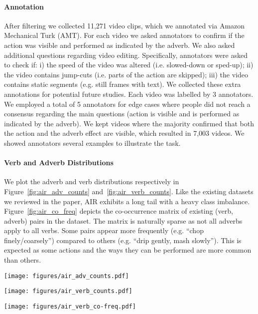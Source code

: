 \documentclass[10pt,twocolumn,letterpaper]{article}
\begin{document}
\paragraph{Annotation} After filtering we collected 11,271 video clips, which we annotated via Amazon Mechanical Turk (AMT). For each video we asked annotators to confirm if the action was visible and performed as indicated by the adverb. We also asked additional questions regarding video editing. Specifically, annotators were asked to check if: i) the speed of the video was altered (i.e. slowed-down or sped-up); ii) the video contains jump-cuts (i.e. parts of the action are skipped); iii) the video contains static segments (e.g. still frames with text). We collected these extra annotations for potential future studies. Each video was labelled by 3 annotators. We employed a total of 5 annotators for edge cases where people did not reach a consensus regarding the main questions (action is visible and is performed as indicated by the adverb). We kept videos where the majority confirmed that both the action and the adverb effect are visible, which resulted in 7,003 videos. We showed annotators several examples to illustrate the task. 

\vspace{-10pt}

\paragraph{Verb and Adverb Distributions} We plot the adverb and verb distributions respectively in Figure~\ref{fig:air_adv_counts} and~\ref{fig:air_verb_counts}. Like the existing datasets we reviewed in the paper, 
AIR exhibits a long tail with a heavy class imbalance. 
Figure~\ref{fig:air_co_freq} depicts the co-occurrence matrix of existing (verb, adverb) pairs in the dataset. The matrix is naturally sparse as not all adverbs apply to all verbs. Some 
pairs appear more frequently (e.g. ``chop finely/coarsely'') compared to others (e.g. ``drip gently, mash slowly''). This is expected as some actions and the ways they can be performed are more common than others.

\begin{figure*}[t]
    \centering
    \texttt{[image: figures/air\_adv\_counts.pdf]}
    \caption{Adverbs in Recipes: adverb distribution (log scale).}
    \label{fig:air_adv_counts}
    \vspace{5pt}
    \centering
    \texttt{[image: figures/air\_verb\_counts.pdf]}
    \caption{Adverbs in Recipes: verb distribution (log scale).}
    \label{fig:air_verb_counts}
    \vspace{5pt}
    \centering
    \texttt{[image: figures/air\_verb\_co-freq.pdf]}
    \caption{Adverbs in Recipes: verb-adverb co-occurrences. Darker (green)/Brighter (yellow) correspond to less/more frequent pairs. A missing square indicates that the pair does not appear in the dataset.}
    \label{fig:air_co_freq}
\end{figure*}
\end{document}
